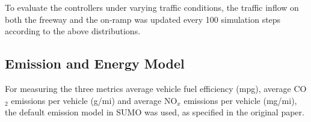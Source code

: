 To evaluate the controllers under varying traffic conditions, the traffic inflow on both the freeway and the on-ramp was updated every 100 simulation steps according to the above distributions. 


\subsection{Emission and Energy Model}

For measuring the three metrics average vehicle fuel efficiency (mpg), average CO$_2$ emissions per vehicle (g/mi) and average NO$_x$ emissions per vehicle (mg/mi), the default emission model in SUMO \cite{krajzewicz2014sumo} was used, as specified in the original paper. 
